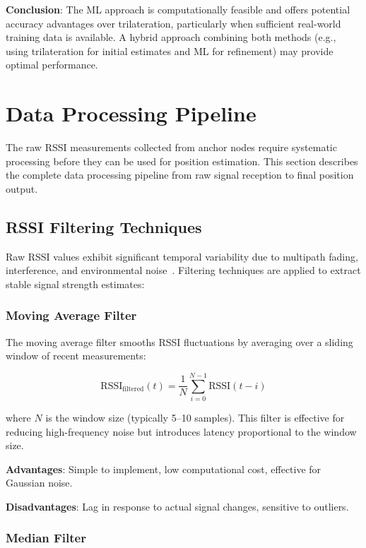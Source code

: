 \textbf{Conclusion}: The ML approach is computationally feasible and offers potential accuracy advantages over trilateration, particularly when sufficient real-world training data is available. A hybrid approach combining both methods (e.g., using trilateration for initial estimates and ML for refinement) may provide optimal performance.


\section{Data Processing Pipeline}
\label{sec:data_processing}

The raw RSSI measurements collected from anchor nodes require systematic processing before they can be used for position estimation. This section describes the complete data processing pipeline from raw signal reception to final position output.

\subsection{RSSI Filtering Techniques}

Raw RSSI values exhibit significant temporal variability due to multipath fading, interference, and environmental noise~\cite{goldoni2010experimental, lemic2017experimental}. Filtering techniques are applied to extract stable signal strength estimates:

\subsubsection{Moving Average Filter}

The moving average filter smooths RSSI fluctuations by averaging over a sliding window of recent measurements:

\begin{equation}
\text{RSSI}_{\text{filtered}}(t) = \frac{1}{N} \sum_{i=0}^{N-1} \text{RSSI}(t-i)
\end{equation}

where $N$ is the window size (typically 5--10 samples). This filter is effective for reducing high-frequency noise but introduces latency proportional to the window size.

\textbf{Advantages}: Simple to implement, low computational cost, effective for Gaussian noise.

\textbf{Disadvantages}: Lag in response to actual signal changes, sensitive to outliers.

\subsubsection{Median Filter}

